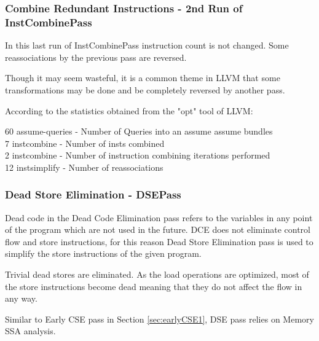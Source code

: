 \subsubsection{Combine Redundant Instructions - 2nd Run of InstCombinePass}
In this last run of InstCombinePass instruction count is not changed. Some reassociations by the previous pass are reversed.





Though it may seem wasteful, it is a common theme in LLVM that some transformations may be done and be completely reversed by another pass. 


According to the statistics obtained from the "opt" tool of LLVM:
\begin{displayquote}
60 assume-queries - Number of Queries into an assume assume bundles \\
 7 instcombine    - Number of insts combined \\
 2 instcombine    - Number of instruction combining iterations performed \\
12 instsimplify   - Number of reassociations \\
\end{displayquote}


\subsubsection{Dead Store Elimination - DSEPass}
Dead code in the Dead Code Elimination pass refers to the variables in any point of the program which are not used in the future. DCE does not eliminate control flow and store instructions, for this reason Dead Store Elimination pass is used to simplify the store instructions of the given program.

Trivial dead stores are eliminated. As the load operations are optimized, most of the store instructions become dead meaning that they do not affect the flow in any way.

Similar to Early CSE pass in Section \ref{sec:earlyCSE1}, DSE pass relies on Memory SSA analysis.




